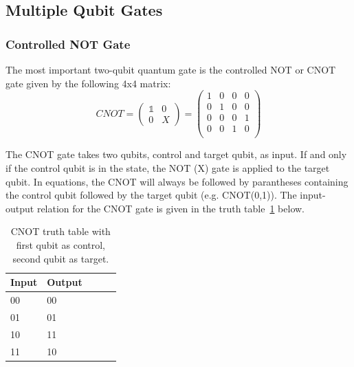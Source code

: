 

\subsection{Multiple Qubit Gates}
\label{subsubsec:multiqubitgates}

\subsubsection{Controlled NOT Gate}
\label{subsubsubsec:cnotgate}

The most important two-qubit quantum gate is the controlled NOT or CNOT gate given by the following 4x4 matrix:
\begin{equation}
CNOT = \begin{pmatrix}
 \mathbb{1} & 0 \\ 
 0 & X
 \end{pmatrix} = \begin{pmatrix}
 1 & 0 & 0 & 0 \\ 
 0 & 1 & 0 & 0 \\
 0 & 0 & 0 & 1 \\
 0 & 0 & 1 & 0 \\
 \end{pmatrix}
\end{equation}

The CNOT gate takes two qubits, control and target qubit, as input. If and only if the control qubit is in the \1 state, the NOT (X) gate is applied to the target qubit. In equations, the CNOT will always be followed by parantheses containing the control qubit followed by the target qubit (e.g. CNOT(0,1)). The input-output relation for the CNOT gate is given in the truth table~\ref{tab:cnottruthtable} below.

\begin{table}[H]
\begin{center}
\caption{CNOT truth table with first qubit as control, second qubit as target.}\vspace{1ex}
\label{tab:cnottruthtable}
\begin{tabular}{llccc}\hline
Input & Output \\ \hline
00 & 00 \\
01 & 01 \\
10 & 11 \\
11 & 10 \\ \hline
\end{tabular}
\end{center}
\end{table}


